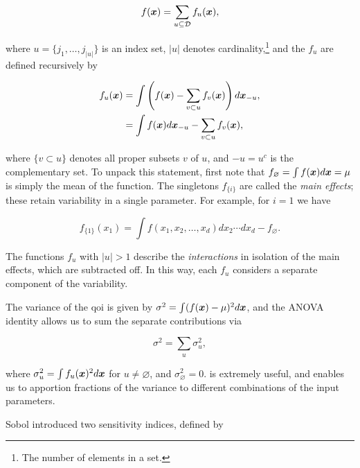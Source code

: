 \documentclass[../primer.tex]{subfiles}
\begin{document}
\begin{equation}\label{eq:f-anova}
  f(\boldsymbol{x}) = \sum_{u\subseteq\mathcal{D}} f_u(\boldsymbol{x}),
\end{equation}

\noindent where \(u=\{j_1,\dots,j_{|u|}\}\) is an index set, \(|u|\) denotes
cardinality,\footnote{The number of elements in a set.} and the \(f_u\) are defined
recursively by

\begin{equation}\begin{aligned}\label{eq:f-anova-rec}
  f_u(\boldsymbol{x}) &= \int\left(f(\boldsymbol{x})-\sum_{v\subset u} f_v(\boldsymbol{x})\right)d\boldsymbol{x}_{-u}, \\
  &= \int f(\boldsymbol{x})d\boldsymbol{x}_{-u} - \sum_{v\subset u} f_v(\boldsymbol{x}),
\end{aligned}\end{equation}

\noindent where \(\{v\subset u\}\) denotes all proper subsets \(v\) of \(u\), and
\(-u=u^c\) is the complementary set. To unpack this statement, first note that
\(f_{\varnothing}=\int f(\boldsymbol{x})d\boldsymbol{x}=\mu\) is simply the mean of the function. The
singletons \(f_{\{i\}}\) are called the \emph{main effects}; these retain variability
in a single parameter. For example, for \(i=1\) we have

\begin{equation}
  f_{\{1\}}(x_1) = \int f(x_1,x_2,\dots,x_d)dx_2\cdots dx_d - f_{\varnothing}.
\end{equation}

\noindent The functions \(f_u\) with \(|u|>1\) describe the \emph{interactions} in
isolation of the main effects, which are subtracted off. In this way, each \(f_u\)
considers a separate component of the variability.

The variance of the qoi is given by \(\sigma^2=\int(f(\boldsymbol{x})-\mu)^2d\boldsymbol{x}\), and the
ANOVA identity allows us to sum the separate contributions via

\begin{equation}\label{eq:anova-idet}
  \sigma^2 = \sum_u \sigma_u^2,
\end{equation}

\noindent where \(\sigma_u^2 = \int f_u(\boldsymbol{x})^2d\boldsymbol{x}\) for \(u\neq\varnothing\), and
\(\sigma_{\varnothing}^2=0\).  is extremely useful, and
enables us to apportion fractions of the variance to different combinations of
the input parameters.

Sobol \cite{sobol1993} introduced two sensitivity indices, defined by
\end{document}
